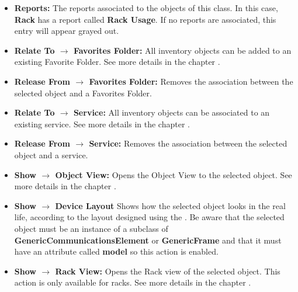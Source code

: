 \documentclass[a4paper]{article}
\begin{document}
\begin{itemize}
		\item \textbf{Reports:} The reports associated to the objects of this class. In this case, \textbf{Rack} has a report called \textbf{Rack Usage}. If no reports are associated, this entry will appear grayed out.
		\item \textbf{Relate To $\rightarrow$ Favorites Folder:} All inventory objects can be added to an existing Favorite Folder. See more details in the chapter \textbf{}.
		\item \textbf{Release From $\rightarrow$ Favorites Folder:} Removes the association between the selected object and a Favorites Folder.
		\item \textbf{Relate To $\rightarrow$ Service:} All inventory objects can be associated to an existing service. See more details in the chapter \textbf{}.
		\item \textbf{Release From $\rightarrow$ Service:} Removes the association between the selected object and a service.
		\item \textbf{Show $\rightarrow$ Object View:} Opens the Object View to the selected object. See more details in the chapter \textbf{}.
		\item \textbf{Show $\rightarrow$ Device Layout} Shows how the selected object looks in the real life, according to the layout designed using the . Be aware that the selected object must be an instance of a subclass of \textbf{GenericCommunicationsElement} or \textbf{GenericFrame} and that it must have an attribute called \textbf{model} so this action is enabled.
		\item \textbf{Show $\rightarrow$ Rack View:} Opens the Rack view of the selected object. This action is only available for racks. See more details in the chapter \textbf{}.
		

\end{itemize}
\end{document}
